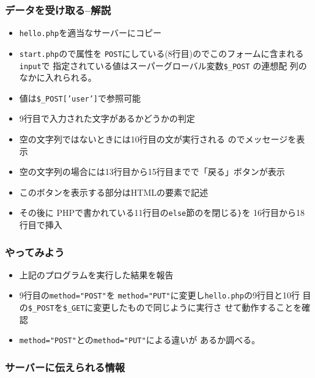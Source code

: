 \begin{frame}[containsverbatim]
 \frametitle{データを受け取る--解説}
 \begin{itemize}
  \item  \texttt{hello.php}を適当なサーバーにコピー
  \item \texttt{start.php}ので属性を
       \texttt{POST}にしている(8行目)のでこのフォームに含まれる\texttt{input}で
       指定されている値はスーパーグローバル変数\texttt{\$\_POST} の連想配
       列のなかに入れられる。
  \item 値は\texttt{\$\_POST['user']}で参照可能
  \item 9行目で入力された文字があるかどうかの判定
  \item 空の文字列ではないときには10行目の文が実行される
       のでメッセージを表示
  \item 空の文字列の場合には13行目から15行目までで「戻る」ボタンが表示
  \item このボタンを表示する部分はHTMLの要素で記述
  \item その後に
				PHPで書かれている11行目の\texttt{else}節のを閉じる\texttt{\}}を
				16行目から18行目で挿入
 \end{itemize}
\end{frame}
\begin{frame}[containsverbatim]
 \frametitle{やってみよう}
 \begin{itemize}
  \item 上記のプログラムを実行した結果を報告
	\item 9行目の\Verb+method="POST"+を
				\Verb+method="PUT"+に変更し\texttt{hello.php}の9行目と10行
				目の\Verb+$_POST+を\Verb+$_GET+に変更したもので同じように実行さ
				せて動作することを確認
	\item \Verb+method="POST"+との\Verb+method="PUT"+による違いが
				あるか調べる。
 \end{itemize}
\end{frame}
\begin{frame}[containsverbatim]
 \frametitle{サーバーに伝えられる情報}
\end{frame}
